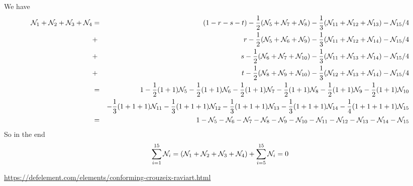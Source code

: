 We have
\begin{eqnarray}
\bN_1+\bN_2+\bN_3+\bN_4 
&=& (1-r-s-t) -\frac12 (\bN_5+\bN_7+\bN_8)-\frac13(\bN_{11}+\bN_{12}+\bN_{13})-\bN_{15}/4 \nn\\
&+& r-\frac12(\bN_5+\bN_6+\bN_9)    -\frac13(\bN_{11}+\bN_{12}+\bN_{14}) -\bN_{15}/4 \\
&+& s-\frac12(\bN_6+\bN_7+\bN_{10}) -\frac13(\bN_{11}+\bN_{13}+\bN_{14}) -\bN_{15}/4 \\
&+& t-\frac12(\bN_8+\bN_9+\bN_{10}) -\frac13(\bN_{12}+\bN_{13}+\bN_{14}) -\bN_{15}/4 \\
&=& 1 -\frac12(1+1)\bN_5 -\frac12(1+1)\bN_6 -\frac12(1+1)\bN_7 -\frac12(1+1)\bN_8 -\frac12(1+1)\bN_9 -\frac12(1+1)\bN_{10}    \nn\\
&&  -\frac13(1+1+1)\bN_{11} -\frac13(1+1+1)\bN_{12} -\frac13(1+1+1)\bN_{13} -\frac13(1+1+1)\bN_{14} 
-\frac{1}{4}(1+1+1+1)\bN_{15} \nn\\
&=& 1 -\bN_5 -\bN_6 -\bN_7 -\bN_8 -\bN_{9} -\bN_{10}
      -\bN_{11} -\bN_{12} -\bN_{13} -\bN_{14} -\bN_{15} 
\end{eqnarray}
So in the end
\[
\sum_{i=1}^{15} \bN_i = (\bN_1+\bN_2+\bN_3+\bN_4)  + \sum_{i=5}^{15} \bN_i = 0
\]

\url{https://defelement.com/elements/conforming-crouzeix-raviart.html}
